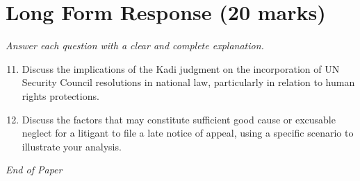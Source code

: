 \documentclass[12pt]{article}
\begin{document}
\section*{Long Form Response (20 marks)}
\textit{Answer each question with a clear and complete explanation.}
\begin{enumerate}[label=\arabic*.]
\setcounter{enumi}{10}
\item Discuss the implications of the Kadi judgment on the incorporation of UN Security Council resolutions in national law, particularly in relation to human rights protections.
\item Discuss the factors that may constitute sufficient good cause or excusable neglect for a litigant to file a late notice of appeal, using a specific scenario to illustrate your analysis.
\end{enumerate}

\vfill
\noindent\textit{End of Paper}
\end{document}
